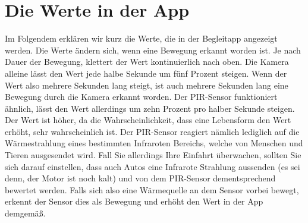\documentclass[12pt,a4paper]{scrreprt}
\begin{document}
\section{Die Werte in der App}
Im Folgendem erklären wir kurz die Werte, die in der Begleitapp angezeigt werden. Die Werte ändern sich, wenn eine Bewegung erkannt worden ist. Je nach Dauer der Bewegung, klettert der Wert kontinuierlich nach oben. Die Kamera alleine lässt den Wert jede halbe Sekunde um fünf Prozent  steigen. Wenn der Wert also mehrere Sekunden lang steigt, ist auch mehrere Sekunden lang eine Bewegung durch die Kamera erkannt worden. Der PIR-Sensor funktioniert ähnlich, lässt den Wert allerdings um zehn Prozent pro halber Sekunde steigen. Der Wert ist höher, da die Wahrscheinlichkeit, dass eine Lebensform den Wert erhöht, sehr wahrscheinlich ist. Der PIR-Sensor reagiert nämlich lediglich auf die Wärmestrahlung eines bestimmten Infraroten Bereichs, welche von Menschen und Tieren ausgesendet wird. Fall Sie allerdings Ihre Einfahrt überwachen, sollten Sie sich darauf einstellen, dass auch Autos eine Infrarote Strahlung aussenden (es sei denn, der Motor ist noch kalt) und von dem PIR-Sensor dementsprechend bewertet werden. Falls sich also eine Wärmequelle an dem Sensor vorbei bewegt, erkennt der Sensor dies als Bewegung und erhöht den Wert in der App demgemäß. 
\end{document}
